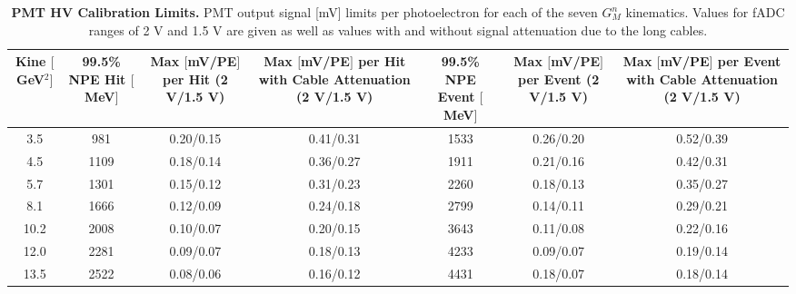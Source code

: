 \documentclass[10pt]{article}
\begin{document}
	\begin{table}[h]
	\centering
	\begin{tabular}{|c|cccccc|}
	\hline
	\makecell{Kine\\$[$GeV$^2]$} & \makecell{99.5\%\\NPE\\Hit\\$[$MeV$]$} & \makecell{Max $[$mV/PE$]$\\per Hit\\(2 V/1.5 V)} & \makecell{Max $[$mV/PE$]$\\per Hit\\with Cable\\Attenuation\\(2 V/1.5 V)} & \makecell{99.5\%\\NPE\\Event\\$[$MeV$]$} & \makecell{Max $[$mV/PE$]$\\per Event\\(2 V/1.5 V)} & \makecell{Max $[$mV/PE$]$\\per Event\\with Cable\\Attenuation\\(2 V/1.5 V)}\\
	\hline
	3.5 & 981 & 0.20/0.15 & 0.41/0.31 & 1533 & 0.26/0.20 & 0.52/0.39\\
    4.5 & 1109 & 0.18/0.14 & 0.36/0.27 & 1911 & 0.21/0.16 & 0.42/0.31\\
    5.7 & 1301 & 0.15/0.12 & 0.31/0.23 & 2260 & 0.18/0.13 & 0.35/0.27\\
    8.1 & 1666 & 0.12/0.09 & 0.24/0.18 & 2799 & 0.14/0.11 & 0.29/0.21\\
    10.2 & 2008 & 0.10/0.07 & 0.20/0.15 & 3643 & 0.11/0.08 & 0.22/0.16\\
    12.0 & 2281 & 0.09/0.07 & 0.18/0.13 & 4233 & 0.09/0.07 & 0.19/0.14\\
    13.5 & 2522 & 0.08/0.06 & 0.16/0.12 & 4431 & 0.18/0.07 & 0.18/0.14\\
	\hline
	\end{tabular}
	\caption{{\bf{PMT HV Calibration Limits.}} PMT output signal [mV] limits per photoelectron for each of the seven $G_M^n$ kinematics. Values for fADC ranges of 2 V and 1.5 V are given as well as values with and without signal attenuation due to the long cables.} %
	\label{tab:max_outputs}
	\end{table}
	
\end{document}
